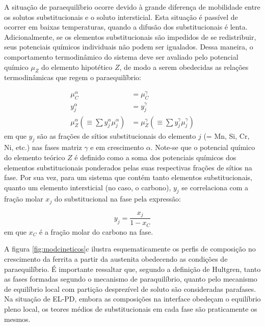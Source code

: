 A situação de paraequilíbrio ocorre devido à grande diferença de mobilidade entre os solutos substitucionais e o soluto intersticial. Esta situação é passível de ocorrer em baixas temperaturas, quando a difusão dos substitucionais é lenta\cite{Hillert1953}. Adicionalmente, se os elementos substitucionais são impedidos de se redistribuir, seus potenciais químicos individuais não podem ser igualados. Dessa maneira, o comportamento termodinâmico do sistema deve ser avaliado pelo potencial químico $\mu_Z$ do elemento hipotético $Z$\cite{Ghosh2001}, de modo a serem obedecidas as relações termodinâmicas que regem o paraequilíbrio:

\begin{subequations}
	\begin{align}
		\mu_C^\alpha &= \mu_C^\gamma \label{eq:potQuimC}\\
		y_j^\alpha &= y_j^\gamma \label{eq:fracSitios}\\
		\mu_Z^\alpha \left ( \equiv \sum y_j^\alpha \mu_j^\alpha \right) &= \mu_Z^\gamma \left ( \equiv \sum y_j^\gamma \mu_j^\gamma \right ) \label{eq:potQuimZ}
	\end{align}
\end{subequations}
%
em que $y_j$ são as frações de sítios substitucionais do elemento $j$ (= Mn, Si, Cr, Ni, etc.) nas fases matriz $\gamma$ e em crescimento $\alpha$. Note-se que o potencial químico do elemento teórico $Z$ é definido como a soma dos potenciais químicos dos elementos substitucionais ponderados pelas suas respectivas frações de sítios na fase. Por sua vez, para um sistema que contém tanto elementos substitucionais, quanto um elemento intersticial (no caso, o carbono), $y_j$ se correlaciona com a fração molar $x_j$ do substitucional na fase pela expressão:

\begin{equation}
	y_j = \frac{x_j}{1 - x_C}
\end{equation}
%
em que $x_C$ é a fração molar do carbono na fase.

A figura \ref{fig:modcineticos}c ilustra esquematicamente os perfis de composição no crescimento da ferrita a partir da austenita obedecendo as condições de paraequilíbrio. É importante ressaltar que, segundo a definição de Hultgren, tanto as fases formadas segundo o mecanismo de paraquilíbrio, quanto pelo mecanismo de equilíbrio local com partição desprezível de soluto são consideradas parafases. Na situação de EL-PD, embora as composições na interface obedeçam o equilíbrio pleno local, os teores médios de substitucionais em cada fase são praticamente os mesmos\cite{Hillert2004a}.


